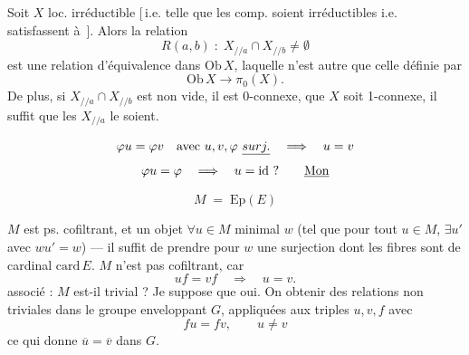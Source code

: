 \documentclass[11pt,a4paper]{article}
\begin{document}


Soit $X$ loc. irréductible [\,i.e. telle que les comp.
  soient irréductibles i.e. satisfassent à
\,]. Alors la relation
\[
  R(a,b) \;:\; X_{/\!/a} \cap X_{/\!/b} \neq \emptyset
\]
est une relation d'équivalence dans $\mathrm{Ob}\, X$, laquelle n'est autre que
celle \struck{\ill{}} définie par
\[
  \mathrm{Ob}\, X \longrightarrow \pi_0(X) .
\]
De plus, si $X_{/\!/a} \cap X_{/\!/b}$ \struck{$\neq \emptyset$} est non vide,
il est 0-connexe, 
  que $X$ soit
1-connexe, il suffit que les $X_{/\!/a}$ le soient.



\[
  \varphi u = \varphi v \quad \text{avec } u, v, \varphi \ \uncertain{surj.}
  \quad \Longrightarrow \quad u = v
\]
\[
  \varphi u = \varphi \quad \Longrightarrow \quad u = \mathrm{id}\ ?
  \qquad \uncertain{\mathrm{Mon}}
\]


\[
  M \;=\; \mathrm{Ep}(E)
\]

$M$ est ps. cofiltrant, et \ill{} un objet \ill{} $\forall u \in M$ minimal $w$
(tel que pour tout $u \in M$, $\exists u'$ avec $w u' = w$) --- il suffit de
prendre pour $w$ une surjection dont les fibres sont de cardinal \ill{}
$\mathrm{card}\, E$. $M$ n'est pas cofiltrant, car
\[
  u f = v f \quad \Longrightarrow \quad u = v .
\]
\ill{}  associé : $M$ est-il trivial ? Je suppose que oui.
On  obtenir des relations non triviales dans le groupe
enveloppant $G$, appliquées aux triples $u, v, f$ \ill{} avec
\[
  f u = f v , \qquad u \neq v
\]
ce qui donne $\overline{u} = \overline{v}$ dans $G$.

\end{document}
